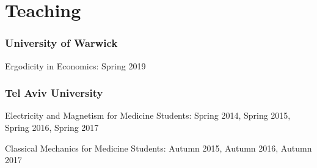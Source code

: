 \documentclass[10pt]{article}
\renewenvironment{itemize}{
  \begin{list}{}{
      \setlength{\leftmargin}{1.0em}
      \setlength{\itemsep}{0.1em}
      \setlength{\parskip}{0pt}
      \setlength{\parsep}{0.2em}
    }
}{
  \end{list}
}
\begin{document}
%
%

\section*{Teaching}

\subsubsection*{University of Warwick}

\begin{itemize}
\item Ergodicity in Economics: Spring 2019
\end{itemize}

\subsubsection*{Tel Aviv University}

\begin{itemize}
\item Electricity and Magnetism for Medicine Students: Spring 2014, Spring 2015, Spring 2016, Spring 2017
\item Classical Mechanics for Medicine Students: Autumn 2015, Autumn 2016, Autumn 2017
\end{itemize}

%
\end{document}
